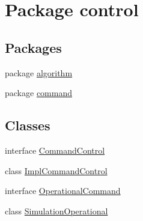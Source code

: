 \hypertarget{namespacecontrol}{}\section{Package control}
\label{namespacecontrol}
\subsection*{Packages}
\begin{DoxyCompactItemize}
\item 
package \mbox{\hyperlink{namespacecontrol_1_1algorithm}{algorithm}}
\item 
package \mbox{\hyperlink{namespacecontrol_1_1command}{command}}
\end{DoxyCompactItemize}
\subsection*{Classes}
\begin{DoxyCompactItemize}
\item 
interface \mbox{\hyperlink{interfacecontrol_1_1_command_control}{Command\+Control}}
\item 
class \mbox{\hyperlink{classcontrol_1_1_impl_command_control}{Impl\+Command\+Control}}
\item 
interface \mbox{\hyperlink{interfacecontrol_1_1_operational_command}{Operational\+Command}}
\item 
class \mbox{\hyperlink{classcontrol_1_1_simulation_operational}{Simulation\+Operational}}
\end{DoxyCompactItemize}
